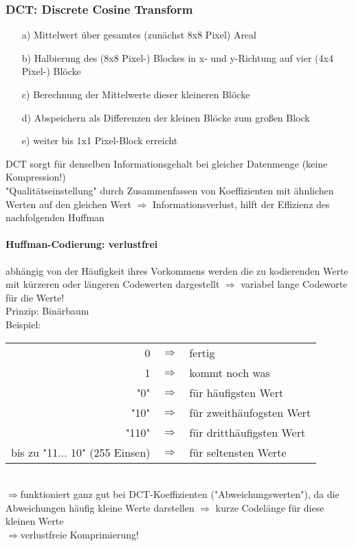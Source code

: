 \subsubsection{DCT: Discrete Cosine Transform}
\begin{itemize}
\item[a)] Mittelwert über gesamtes (zunächst 8x8 Pixel) Areal
\item[b)] Halbierung des (8x8 Pixel-) Blockes in x- und y-Richtung auf vier (4x4 Pixel-) Blöcke
\item[c)] Berechnung der Mittelwerte dieser kleineren Blöcke
\item[d)] Abspeichern als Differenzen der kleinen Blöcke zum großen Block
\item[e)] weiter bis 1x1 Pixel-Block erreicht
\end{itemize}
DCT sorgt für denselben Informationsgehalt bei gleicher Datenmenge (keine Kompression!)\\
"Qualitätseinstellung" durch Zusammenfassen von Koeffizienten mit ähnlichen Werten auf den gleichen Wert $\Rightarrow$ Informationsverlust, hilft der Effizienz des nachfolgenden Huffman

\paragraph{Huffman-Codierung: verlustfrei}abhängig von der Häufigkeit ihres Vorkommens werden die zu kodierenden Werte mit kürzeren oder längeren Codewerten dargestellt $\Rightarrow$ variabel lange Codeworte für die Werte!\\
Prinzip: Binärbaum\\
Beispiel:
\begin{table}[h]
\begin{tabular}{rcl}
0 & $\Rightarrow$ & fertig \\
1  & $\Rightarrow$ & kommt noch was\\
"0"  & $\Rightarrow$ & für häufigsten Wert\\
"10"  & $\Rightarrow$ & für zweithäufogsten Wert\\
"110" & $\Rightarrow$ & für dritthäufigsten Wert\\
bis zu "11... 10" (255 Einsen) & $\Rightarrow$ & für seltensten Werte
\end{tabular}
\end{table}\\
$\Rightarrow$funktioniert ganz gut bei DCT-Koeffizienten ("Abweichungswerten"), da die Abweichungen häufig kleine Werte darstellen $\Rightarrow$ kurze Codelänge für diese kleinen Werte\\
$\Rightarrow$verlustfreie Komprimierung!

